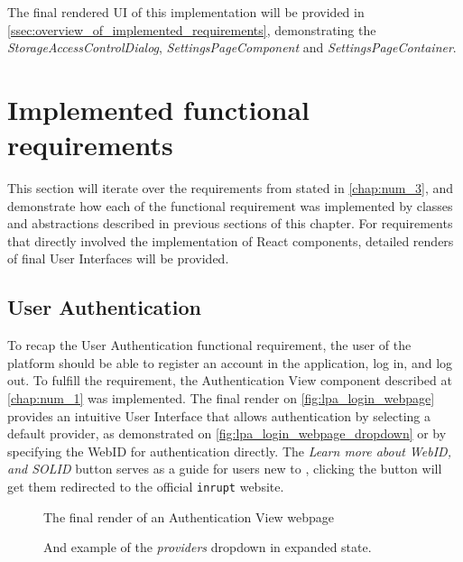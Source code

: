 The final rendered UI of this implementation will be provided in \autoref{ssec:overview_of_implemented_requirements}, demonstrating the \textit{StorageAccessControlDialog}, \textit{SettingsPageComponent} and \textit{SettingsPageContainer}.

\section{Implemented functional requirements}
\label{ssec:overview_of_implemented_requirements}

This section will iterate over the requirements from \lpa{} stated in \autoref{chap:num_3}, and demonstrate how each of the functional requirement was implemented by classes and abstractions described in previous sections of this chapter. For requirements that directly involved the implementation of React components, detailed renders of final User Interfaces will be provided. 

\subsection{User Authentication}

To recap the User Authentication functional requirement, the user of the platform should be able to register an account in the application, log in, and log out. To fulfill the requirement, the Authentication View component described at \autoref{chap:num_1} was implemented. The final render on \autoref{fig:lpa_login_webpage} provides an intuitive User Interface that allows authentication by selecting a default \solid{} provider, as demonstrated on \autoref{fig:lpa_login_webpage_dropdown} or by specifying the WebID for authentication directly. The \textit{Learn more about WebID, and SOLID} button serves as a guide for users new to \solid{}, clicking the button will get them redirected to the official \texttt{inrupt} website. 

\begin{figure}[hbt]
  \caption{The final render of an Authentication View webpage}
  \label{fig:lpa_login_webpage}
\endminipage\hfill
{}
  \caption{And example of the \textit{providers} dropdown in expanded state.}
  \label{fig:lpa_login_webpage_dropdown}
\endminipage\hfill
\end{figure}

